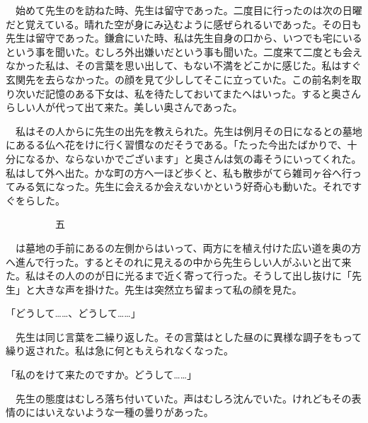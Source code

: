 \documentclass[a4j,onecolumn]{tarticle}
\begin{document}
　始めて先生のを訪ねた時、\hbox{}先生は留守であった。\hbox{}二度目に行ったのは次の日曜だと覚えている。\hbox{}晴れた空が身にみ込むように感ぜられるいであった。\hbox{}その日も先生は留守であった。\hbox{}鎌倉にいた時、\hbox{}私は先生自身の口から、\hbox{}いつでも宅にいるという事を聞いた。\hbox{}むしろ外出嫌いだという事も聞いた。\hbox{}二度来て二度とも会えなかった私は、\hbox{}その言葉を思い出して、\hbox{}もない不満をどこかに感じた。\hbox{}私はすぐ玄関先を去らなかった。\hbox{}の顔を見て少ししてそこに立っていた。\hbox{}この前名刺を取り次いだ記憶のある下女は、\hbox{}私を待たしておいてまたへはいった。\hbox{}すると奥さんらしい人が代って出て来た。\hbox{}美しい奥さんであった。\hbox{}\par{}
　私はその人からに先生の出先を教えられた。\hbox{}先生は例月その日になるとの墓地にあるる仏へ花をけに行く習慣なのだそうである。\hbox{}「たった今出たばかりで、\hbox{}十分になるか、\hbox{}ならないかでございます」と奥さんは気の毒そうにいってくれた。\hbox{}私はして外へ出た。\hbox{}かな町の方へ一ほど歩くと、\hbox{}私も散歩がてら雑司ヶ谷へ行ってみる気になった。\hbox{}先生に会えるか会えないかという好奇心も動いた。\hbox{}それですぐをらした。\hbox{}\par{}\par{}　　　　　五
\par{}
　は墓地の手前にあるの左側からはいって、\hbox{}両方にを植え付けた広い道を奥の方へ進んで行った。\hbox{}するとそのれに見えるの中から先生らしい人がふいと出て来た。\hbox{}私はその人ののが日に光るまで近く寄って行った。\hbox{}そうして出し抜けに「先生」と大きな声を掛けた。\hbox{}先生は突然立ち留まって私の顔を見た。\hbox{}\par{}
「どうして……、\hbox{}どうして……」\par{}
　先生は同じ言葉を二繰り返した。\hbox{}その言葉はとした昼のに異様な調子をもって繰り返された。\hbox{}私は急に何ともえられなくなった。\hbox{}\par{}
「私のをけて来たのですか。\hbox{}どうして……」\par{}
　先生の態度はむしろ落ち付いていた。\hbox{}声はむしろ沈んでいた。\hbox{}けれどもその表情のにはいえないような一種の曇りがあった。\hbox{}\par{}
\end{document}
